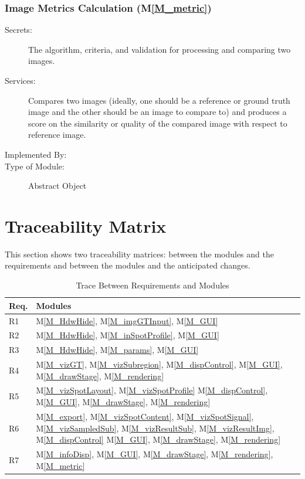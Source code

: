 \documentclass[12pt, titlepage]{article}
\newcommand{\mref}[1]{M\ref{#1}}
\begin{document}
\subsubsection{Image Metrics Calculation (\mref{M_metric})}
\begin{description}
\item[Secrets:] The algorithm, criteria, and validation for processing and comparing two images.
\item[Services:] Compares two images (ideally, one should be a reference or ground truth image
  and the other should be an image to compare to) and produces a score on the 
  similarity or quality of the compared image with respect to reference image.
\item[Implemented By:] \progname{}
\item[Type of Module:] Abstract Object
\end{description}



\section{Traceability Matrix} \label{SecTM}

This section shows two traceability matrices: between the modules and the
requirements and between the modules and the anticipated changes.

\begin{table}[H]
\centering
\begin{tabular}{p{} p{}}
\toprule
\textbf{Req.} & \textbf{Modules}\\
\midrule
R1 & \mref{M_HdwHide}, \mref{M_imgGTInput}, \mref{M_GUI}\\
R2 & \mref{M_HdwHide}, \mref{M_inSpotProfile}, \mref{M_GUI}\\
R3 & \mref{M_HdwHide}, \mref{M_params}, \mref{M_GUI}\\
R4 & \mref{M_vizGT}, \mref{M_vizSubregion}, \mref{M_dispControl}, \mref{M_GUI}, \mref{M_drawStage}, \mref{M_rendering}\\
R5 & \mref{M_vizSpotLayout}, \mref{M_vizSpotProfile} \mref{M_dispControl}, \mref{M_GUI}, \mref{M_drawStage}, \mref{M_rendering}\\
R6 & \mref{M_export}, \mref{M_vizSpotContent}, \mref{M_vizSpotSignal}, \mref{M_vizSampledSub}, \mref{M_vizResultSub}, \mref{M_vizResultImg}, \mref{M_dispControl} \mref{M_GUI}, \mref{M_drawStage}, \mref{M_rendering}\\
R7 & \mref{M_infoDisp}, \mref{M_GUI}, \mref{M_drawStage}, \mref{M_rendering}, \mref{M_metric}\\
\bottomrule
\end{tabular}
\caption{Trace Between Requirements and Modules}
\label{TblRT}
\end{table}
\end{document}
